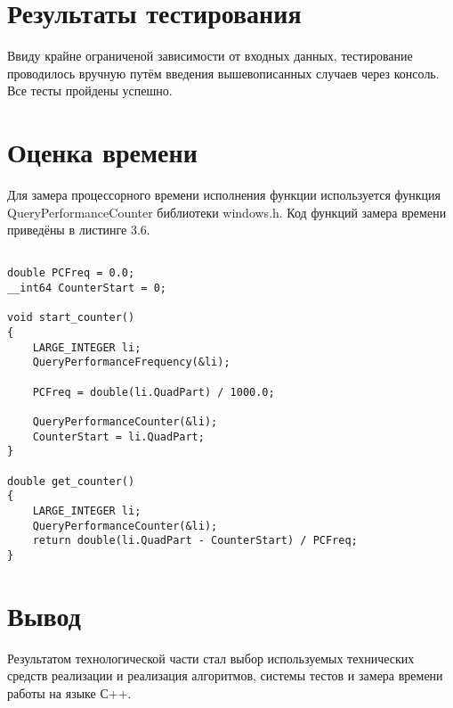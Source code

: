 \section{Результаты тестирования}
Ввиду крайне ограниченой зависимости от входных данных, тестирование проводилось вручную путём введения вышевописанных случаев через консоль. Все тесты пройдены успешно.

\section{Оценка времени}
Для замера процессорного времени исполнения функции используется функция QueryPerformanceCounter библиотеки windows.h\cite{QueryPerformanceCounter}. Код функций замера времени приведёны в листинге 3.6.

\begin{lstlisting}[caption = {Функции замера процессорного времени работы функции}]

double PCFreq = 0.0;
__int64 CounterStart = 0;

void start_counter()
{
	LARGE_INTEGER li;
	QueryPerformanceFrequency(&li);
	
	PCFreq = double(li.QuadPart) / 1000.0;
	
	QueryPerformanceCounter(&li);
	CounterStart = li.QuadPart;
}

double get_counter()
{
	LARGE_INTEGER li;
	QueryPerformanceCounter(&li);
	return double(li.QuadPart - CounterStart) / PCFreq;
}
\end{lstlisting}

\section*{Вывод}
Результатом технологической части стал выбор используемых технических средств реализации и реализация алгоритмов, системы тестов и замера времени работы на языке С++.
